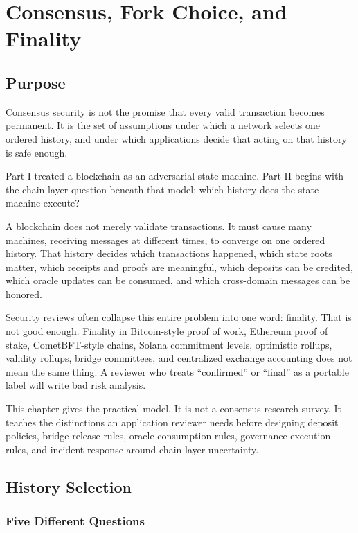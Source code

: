 \chapter{Consensus, Fork Choice, and Finality}

\section{Purpose}

\begin{principlebox}
Consensus security is not the promise that every valid transaction becomes permanent. It is the set of assumptions under which a network selects one ordered history, and under which applications decide that acting on that history is safe enough.
\end{principlebox}

Part I treated a blockchain as an adversarial state machine. Part II begins with the chain-layer question beneath that model: which history does the state machine execute?

A blockchain does not merely validate transactions. It must cause many machines, receiving messages at different times, to converge on one ordered history. That history decides which transactions happened, which state roots matter, which receipts and proofs are meaningful, which deposits can be credited, which oracle updates can be consumed, and which cross-domain messages can be honored.

Security reviews often collapse this entire problem into one word: finality. That is not good enough. Finality in Bitcoin-style proof of work, Ethereum proof of stake, CometBFT-style chains, Solana commitment levels, optimistic rollups, validity rollups, bridge committees, and centralized exchange accounting does not mean the same thing. A reviewer who treats ``confirmed'' or ``final'' as a portable label will write bad risk analysis.

This chapter gives the practical model. It is not a consensus research survey. It teaches the distinctions an application reviewer needs before designing deposit policies, bridge release rules, oracle consumption rules, governance execution rules, and incident response around chain-layer uncertainty.

\section{History Selection}

\subsection{Five Different Questions}

